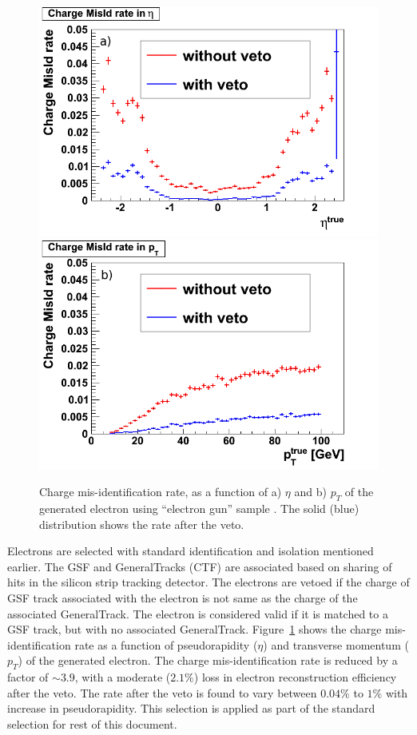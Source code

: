 \begin{figure}[htb]
\begin{center}
\includegraphics[width=0.485\linewidth,height=0.37\linewidth]{figs/ChargeMisIdRateEta.png}
\includegraphics[width=0.485\linewidth,height=0.37\linewidth]{figs/ChargeMisIdRatePt.png}
\caption{Charge mis-identification rate, as a function of a) $\eta$ and b) $p_T$ of the generated
electron using ``electron gun'' sample \label{fig:charge_misid}. The solid (blue) distribution shows
the rate after the veto.}
\end{center}
\end{figure}
Electrons are selected with standard identification and isolation mentioned earlier. The GSF and GeneralTracks 
(CTF) are associated based on sharing of hits in the silicon strip tracking detector. 
The electrons are vetoed if the charge of GSF track associated with the electron is not same 
as the charge of the associated GeneralTrack. The electron is considered valid if it is matched
to a GSF track, but with no associated GeneralTrack. Figure~\ref{fig:charge_misid} shows the charge mis-identification 
rate as a function of pseudorapidity ($\eta$) and transverse momentum ($p_T$) of the generated electron. The charge 
mis-identification rate is reduced by a factor of $\sim 3.9$, with a moderate ($2.1\%$)  loss in electron reconstruction 
efficiency after the veto. The rate after the veto is found to vary between $0.04\%$ to $1\%$ with increase in 
pseudorapidity. This selection is applied as part of the standard selection for rest of this document.
